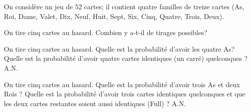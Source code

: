 On considère un jeu de 52 cartes; il contient quatre familles de treize cartes (As, Roi, Dame, Valet, Dix, Neuf, Huit, Sept, Six, Cinq, Quatre,
Trois, Deux).

\medskip

\question
On tire cinq cartes au hasard. Combien y a-t-il de tirages possibles?

\question
On tire cinq cartes au hasard. Quelle est la probabilité d'avoir les quatre As? Quelle est la probabilité d'avoir quatre cartes identiques (un carré) quelconques ? A.N.

\question
On tire cinq cartes au hasard. Quelle est la probabilité d'avoir trois As et deux Rois ? Quelle est la probabilité d'avoir  trois cartes identiques quelconques et que les deux cartes restantes soient aussi identiques (Full) ? A.N.

